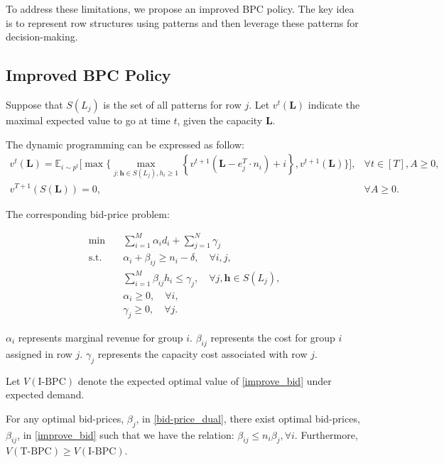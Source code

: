 
To address these limitations, we propose an improved BPC policy. The key idea is to represent row structures using patterns and then leverage these patterns for decision-making.


\subsection{Improved BPC Policy}
Suppose that $S(L_{j})$ is the set of all patterns for row $j$. Let $v^t(\bm{L})$ indicate the maximal expected value to go at time $t$, given the capacity $\bm{L}$.

The dynamic programming can be expressed as follow:
\begin{equation}
    \begin{array}{lr}
    v^t(\bm{L})=\mathbb{E}_{i \sim p^t}\Bigg[\max\Big\{\max_{j :\bm{h} \in S(L_{j}), 
    h_{i} \geqslant 1}\left\{v^{t+1}(\bm{L}- e_{j}^{T} \cdot n_{i})+ {i}\right\}, v^{t+1}(\bm{L})\Big\}\Bigg], & \forall t \in[T], A \geqslant 0, \\
    v^{T+1}(S(\bm{L}))=0, & \forall A \geqslant 0.
    \end{array}
\end{equation}

The corresponding bid-price problem:

\begin{equation}\label{improve_bid}
    \begin{aligned}
    \min \quad & \sum_{i=1}^M \alpha_i d_i+ \sum_{j=1}^N \gamma_j \\
    \mathrm{s.t.} \quad & \alpha_i+\beta_{i j} \geq n_i-\delta, \quad \forall i, j, \\
    & \sum_{i=1}^M \beta_{i j} h_i \leq \gamma_j, \quad \forall j, \bm{h} \in S(L_j), \\
    & \alpha_i \geq 0, \quad \forall i, \\
    & \gamma_j \geq 0, \quad \forall j .
    \end{aligned}
\end{equation}

$\alpha_{i}$ represents marginal revenue for group $i$. $\beta_{ij}$ represents the cost for group $i$ assigned in row $j$. $\gamma_{j}$ represents the capacity cost associated with row $j$.

Let $V(\text{I-BPC})$ denote the expected optimal value of \eqref{improve_bid} under expected demand.

\begin{lem}
For any optimal bid-prices, $\beta_{j}$, in \eqref{bid-price_dual}, there exist optimal bid-prices, $\beta_{ij}$, in \eqref{improve_bid} such that we have the relation:
$\beta_{ij} \leq n_{i} \beta_{j}, \forall i$. Furthermore, $V(\text{T-BPC}) \geq V(\text{I-BPC})$.
\end{lem}

